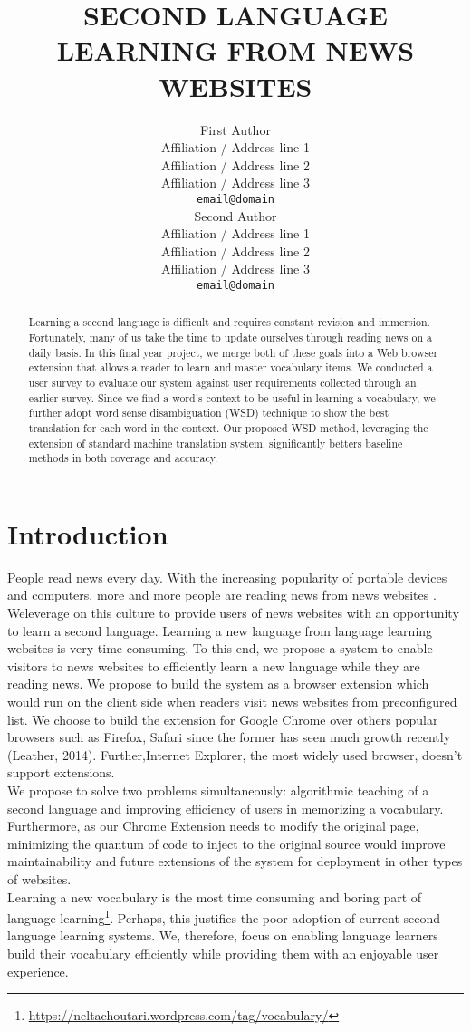\documentclass[11pt]{article}
\title{SECOND LANGUAGE LEARNING FROM NEWS WEBSITES}
\author{First Author \\
  Affiliation / Address line 1 \\
  Affiliation / Address line 2 \\
  Affiliation / Address line 3 \\
  {\tt email@domain} \\\And
  Second Author \\
  Affiliation / Address line 1 \\
  Affiliation / Address line 2 \\
  Affiliation / Address line 3 \\
  {\tt email@domain} \\}
\date{}
\begin{document}
\maketitle
\begin{abstract}
Learning a second language is difficult and requires
constant revision and immersion.  Fortunately, many of us take the
time to update ourselves through reading news on a daily basis.  
In this final year project, we merge both of these goals into a Web browser extension that allows a reader to learn and master vocabulary items. 
We conducted a user survey to evaluate our system against user requirements collected through an earlier survey. Since we find a word's context to be useful in learning a vocabulary, we further adopt word sense disambiguation (WSD)
technique to show the best translation for each word in the context.
Our proposed WSD method, leveraging the extension of standard machine translation system, significantly betters  baseline methods in both coverage and accuracy.
\end{abstract}


\section{Introduction}
People read news every day. With the increasing popularity of 
portable devices and computers, more and more people are reading 
news from news websites \cite{yarlh2012}.
\\
Weleverage on this culture to provide users of news websites 
with an opportunity to learn a second language.
Learning a new language from language learning websites is very time consuming. 
To this end, we propose a system to enable visitors to news websites to 
efficiently learn a new language while they are reading news. We propose to 
build the system as a browser extension which would run on the client side 
when readers visit news websites from preconfigured list.
We choose to build the extension for Google Chrome over others popular browsers 
such as Firefox, Safari since the former has seen much growth recently (Leather, 2014). 
Further,Internet Explorer, the most widely used browser, doesn't support extensions.
\\
We propose to solve two problems simultaneously: algorithmic  
teaching of a second language and improving efficiency of users in 
memorizing a vocabulary.
Furthermore, as our Chrome Extension needs to modify the original page, 
minimizing the quantum of code to inject to the original source would 
improve maintainability and future extensions of the system 
for deployment in other types of websites.
\\ 
Learning a new vocabulary is the most time consuming and boring part of 
language learning\footnote{\url{https://neltachoutari.wordpress.com/tag/vocabulary/}}. Perhaps, this justifies the 
poor adoption of current second language learning systems. We, therefore, 
focus on enabling language learners build their vocabulary efficiently while 
providing them with an enjoyable user experience.
\end{document}
